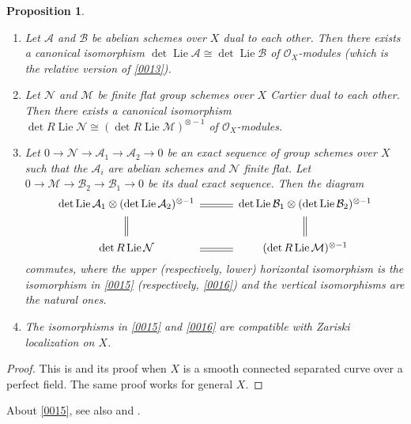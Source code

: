 \documentclass{amsart}
\newtheorem{proposition}[theorem]{Proposition}
\theoremstyle{remark}
\numberwithin{equation}{section}
\newcommand{\Order}{\mathcal{O}}
\newcommand{\tensor}{\mathbin{\otimes}}
\DeclareMathOperator{\Lie}{Lie}
\begin{document}
\begin{proposition} \label{0021} \mbox{}
	\begin{enumerate}
	\item \label{0015}
		Let $\mathcal{A}$ and $\mathcal{B}$ be abelian schemes over $X$
		dual to each other.
		Then there exists a canonical isomorphism
		$\det \Lie \mathcal{A} \cong \det \Lie \mathcal{B}$
		of $\Order_{X}$-modules
		(which is the relative version of \eqref{0013}).
	\item \label{0016}
		Let $\mathcal{N}$ and $\mathcal{M}$ be
		finite flat group schemes over $X$
		Cartier dual to each other.
		Then there exists a canonical isomorphism
		$\det R \Lie \mathcal{N} \cong (\det R \Lie \mathcal{M})^{\tensor -1}$
		of $\Order_{X}$-modules.
	\item \label{0017}
		Let $0 \to \mathcal{N} \to \mathcal{A}_{1} \to \mathcal{A}_{2} \to 0$
		be an exact sequence of group schemes over $X$
		such that the $\mathcal{A}_{i}$ are abelian schemes
		and $\mathcal{N}$ finite flat.
		Let $0 \to \mathcal{M} \to \mathcal{B}_{2} \to \mathcal{B}_{1} \to 0$
		be its dual exact sequence.
		Then the diagram
			\[
				\begin{CD}
							\det \Lie \mathcal{A}_{1}
						\tensor
							(\det \Lie \mathcal{A}_{2})^{\tensor -1}
					@=
							\det \Lie \mathcal{B}_{1}
						\tensor
							(\det \Lie \mathcal{B}_{2})^{\tensor -1}
					\\ @| @| \\
						\det R \Lie \mathcal{N}
					@=
						(\det R \Lie \mathcal{M})^{\tensor -1}
				\end{CD}
			\]
		commutes,
		where the upper (respectively, lower) horizontal isomorphism is
		the isomorphism in \eqref{0015} (respectively, \eqref{0016})
		and the vertical isomorphisms are the natural ones.
	\item \label{0022}
		The isomorphisms in \eqref{0015} and \eqref{0016} are compatible
		with Zariski localization on $X$.
	\end{enumerate}
\end{proposition}

\begin{proof}
	This is \cite[Proposition 9.1]{GRS24}
	and its proof
	when $X$ is a smooth connected separated curve over a perfect field.
	The same proof works for general $X$.
\end{proof}

About \eqref{0015}, see also \cite[Lemma 1.1.3]{Lau96}
and \cite[Lemma (13.9)]{EGM12}.
\end{document}
